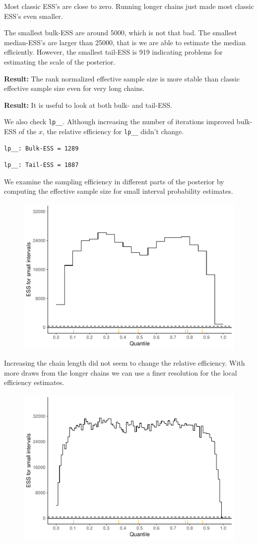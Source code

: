 \documentclass[american,]{article}
\begin{document}
Most classic ESS's are close to zero. Running longer chains just made
most classic ESS's even smaller.

The smallest bulk-ESS are around 5000, which is not that bad. The
smallest median-ESS's are larger than 25000, that is we are able to
estimate the median efficiently. However, the smallest tail-ESS is 919
indicating problems for estimating the scale of the posterior.

\textbf{Result:} The rank normalized effective sample size is more
stable than classic effective sample size even for very long chains.

\textbf{Result:} It is useful to look at both bulk- and tail-ESS.

We also check \texttt{lp\_\_}. Although increasing the number of
iterations improved bulk-ESS of the \(x\), the relative efficiency for
\texttt{lp\_\_} didn't change.

\begin{verbatim}
lp__: Bulk-ESS = 1289
\end{verbatim}

\begin{verbatim}
lp__: Tail-ESS = 1887
\end{verbatim}

We examine the sampling efficiency in different parts of the posterior
by computing the effective sample size for small interval probability
estimates.

\begin{figure}[tp]
  \centering
  \includegraphics[width=0.6\linewidth]{graphics/local-ess-fit-nom-td20l-1.pdf}
\end{figure}

Increasing the chain length did not seem to change the relative
efficiency. With more draws from the longer chains we can use a finer
resolution for the local efficiency estimates.

\begin{figure}[tp]
  \centering
  \includegraphics[width=0.6\linewidth]{graphics/local-ess-fit-nom-td20l-finer-1.pdf}
\end{figure}
\end{document}
